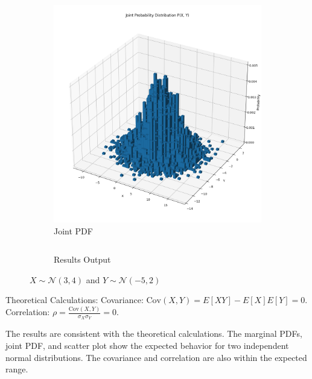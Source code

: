 \documentclass{article}
\begin{document}
\begin{figure}[H]
\begin{subfigure}{0.45\textwidth}
    \centering \includegraphics[width=\linewidth]{results/section2/b(2).png}
    \caption{Joint PDF}
  \end{subfigure}
  \begin{subfigure}{\textwidth}
    \inputminted{text}{results/section2/b.txt}
    \caption{Results Output}
  \end{subfigure}
  \caption{$X \sim \mathcal{N}(3, 4)$ and $Y \sim \mathcal{N}(-5, 2)$}
\end{figure}

Theoretical Calculations:
Covariance: $\text{Cov}(X,Y) = E[XY] - E[X]E[Y] = 0$.
Correlation: $\rho = \frac{\text{Cov}(X,Y)}{\sigma_X\sigma_Y} = 0$.

The results are consistent with the theoretical calculations. The marginal PDFs, joint PDF, and scatter plot show the expected behavior for two independent normal distributions. The covariance and correlation are also within the expected range.

\newpage
\end{document}
